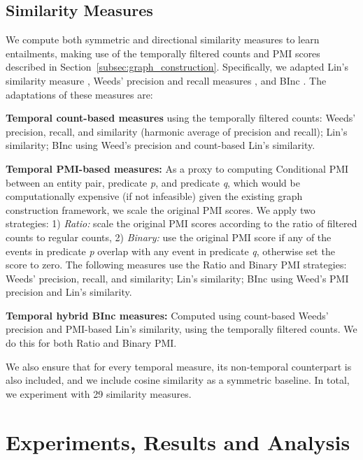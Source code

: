 \documentclass[11pt]{article}
\begin{document}
\subsection{Similarity Measures}
\label{subsec:similarity_measures}
We compute both symmetric and directional similarity measures to learn entailments, making use of the temporally filtered counts and PMI scores described in Section~\ref{subsec:graph_construction}. Specifically, we adapted Lin's similarity measure \cite{lin1998}, Weeds' precision and recall measures \cite{weeds2003}, and BInc \cite{szpektor2008}. The adaptations of these measures are:

\textbf{Temporal count-based measures} using the temporally filtered counts: Weeds' precision, recall, and similarity (harmonic average of precision and recall); Lin's similarity; BInc using Weed's precision and count-based Lin's similarity.

\textbf{Temporal PMI-based measures:}
As a proxy to computing Conditional PMI between an entity pair, predicate \textit{p}, and predicate \textit{q}, which would be computationally expensive (if not infeasible) given the existing graph construction framework, we scale the original PMI scores. We apply two strategies: 1) \textit{Ratio:} scale the original PMI scores according to the ratio of filtered counts to regular counts, 2) \textit{Binary:} use the original PMI score if any of the events in predicate \textit{p} overlap with any event in predicate \textit{q}, otherwise set the score to zero. The following measures use the Ratio and Binary PMI strategies: Weeds' precision, recall, and similarity; Lin's similarity; BInc using Weed's PMI precision and Lin's similarity.

\textbf{Temporal hybrid BInc measures:} Computed using count-based Weeds' precision and PMI-based Lin's similarity, using the temporally filtered counts. We do this for both Ratio and Binary PMI.

We also ensure that for every temporal measure, its non-temporal counterpart is also included, and we include cosine similarity as a symmetric baseline. In total, we experiment with 29 similarity measures.

\section{Experiments, Results and Analysis}
\label{sec:results}
\end{document}
